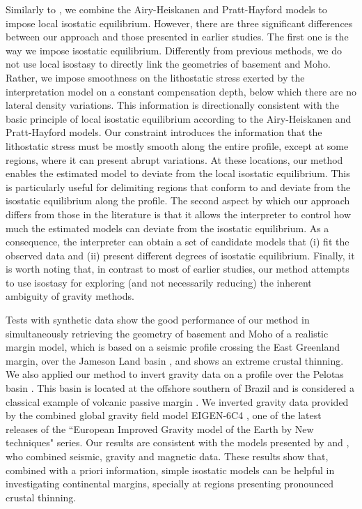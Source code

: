 \documentclass[manuscript,revised]{geophysics}
\begin{document}
Similarly to \citet{ferderer-etal2017}, we combine the Airy-Heiskanen and Pratt-Hayford
models to impose local isostatic equilibrium. However, there are three significant differences
between our approach and those presented in earlier studies.
The first one is the way we impose isostatic equilibrium. Differently from previous 
methods, we do not use local isostasy to directly link the geometries of basement and Moho.
Rather, we impose smoothness on the lithostatic stress exerted by the interpretation 
model on a constant compensation depth, below which there are no lateral density variations.
This information is directionally consistent with the basic principle of 
local isostatic equilibrium according to the Airy-Heiskanen and Pratt-Hayford models.
Our constraint introduces the information that the lithostatic stress must be mostly 
smooth along the entire profile, except at some regions, where it can present abrupt
variations. At these locations, our method enables the estimated model to deviate from the 
local isostatic equilibrium. 
This is particularly useful for delimiting regions that conform to and deviate
from the isostatic equilibrium along the profile.
The second aspect by which our approach differs from those in the literature
is that it allows the interpreter to control how much the 
estimated models can deviate from the isostatic equilibrium.
As a consequence, the interpreter can obtain a set of candidate models 
that (i) fit the observed data and (ii) present different degrees of isostatic 
equilibrium.
Finally, it is worth noting that, in contrast to most of earlier studies, our method 
attempts to use isostasy for exploring (and not necessarily reducing) the inherent 
ambiguity of gravity methods.

Tests with synthetic data show the good performance of our method in simultaneously
retrieving the geometry of basement and Moho of a realistic margin model,
which is based on a seismic profile crossing the East Greenland margin,
over the Jameson Land basin \citep{peron-etal2013}, and shows an extreme crustal thinning.
We also applied our method to invert gravity data on a profile over the Pelotas basin 
\citep{stica-etal2014}. This basin is located at the offshore southern of Brazil and is 
considered a classical example of volcanic passive margin \citep{geoffroy2005}. 
We inverted gravity data provided by the combined global gravity field model EIGEN-6C4
\citep{forste2014}, one of the latest releases of the ``European Improved Gravity model of 
the Earth by New techniques" series.
Our results are consistent with the models presented by \citet{stica-etal2014} and
\citet{zalan2015}, who combined seismic, gravity and magnetic data.
These results show that, combined with a priori information, simple isostatic models 
can be helpful in investigating continental margins, specially at regions presenting pronounced 
crustal thinning.
\end{document}
